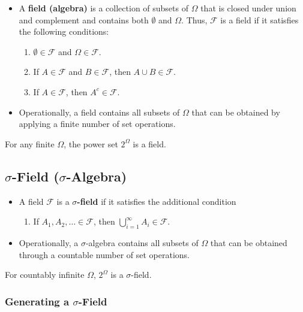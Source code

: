 \begin{itemize}
\item A \textbf{field (algebra)} is a collection of subsets of $\Omega$ that is closed under union and complement and contains both $\emptyset$ and $\Omega$. Thus, $\mathcal{F}$ is a field if it satisfies the following conditions:

\begin{enumerate}
\item $\emptyset\in\mathcal{F}$ and $\Omega\in\mathcal{F}$.
\item If $A\in\mathcal{F}$ and $B\in\mathcal{F}$, then $A\cup B\in\mathcal{F}$.
\item If $A\in\mathcal{F}$, then $A^c\in\mathcal{F}$.
\end{enumerate}


\item Operationally, a field contains all subsets of $\Omega$ that can be obtained by applying a finite number of set operations.
\end{itemize}

\begin{remark}For any finite $\Omega$, the power set $2^\Omega$ is a field.

\end{remark}\subsection{$\sigma$-Field ($\sigma$-Algebra)}

\begin{itemize}
\item A field $\mathcal{F}$ is a \textbf{$\sigma$-field} if it satisfies the additional condition

\begin{enumerate}[resume]
\item If $A_1,A_2,\ldots\in\mathcal{F}$, then
$\bigcup_{i=1}^{\infty}A_i\in\mathcal{F}$.
\end{enumerate}


\item Operationally, a $\sigma$-algebra contains all subsets of $\Omega$ that can be obtained through a countable number of set operations.
\end{itemize}

\begin{remark}For countably infinite $\Omega$, $2^\Omega$ is a $\sigma$-field.

\end{remark}\subsubsection{Generating a $\sigma$-Field}

